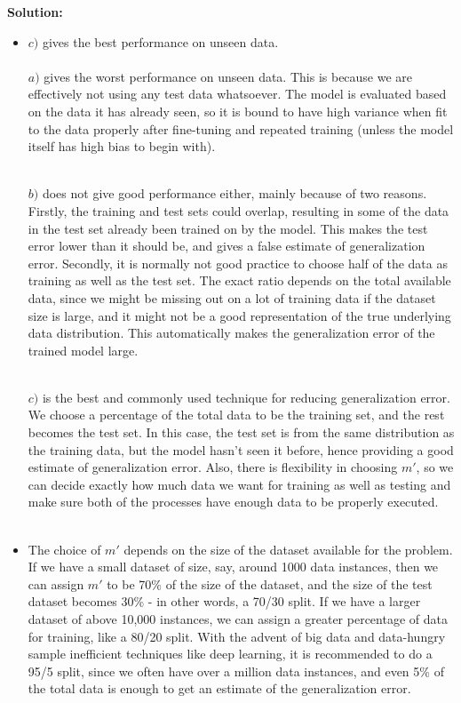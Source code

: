 \documentclass{article}
\begin{document}
\textbf{\LARGE{Solution:}}\Large{\begin{itemize}
    \item $c)$ gives the best performance on unseen data.
    \\\\
    $a)$ gives the worst performance on unseen data. This is because we are effectively not using any test data whatsoever. The model is evaluated based on the data it has already seen, so it is bound to have high variance when fit to the data properly after fine-tuning and repeated training (unless the model itself has high bias to begin with).
        \\\

    $b)$ does not give good performance either, mainly because of two reasons. Firstly, the training and test sets could overlap, resulting in some of the data in the test set already been trained on by the model. This makes the test error lower than it should be, and gives a false estimate of generalization error. Secondly, it is normally not good practice to choose half of the data as training as well as the test set. The exact ratio depends on the total available data, since we might be missing out on a lot of training data if the dataset size is large, and it might not be a good representation of the true underlying data distribution. This automatically makes the generalization error of the trained model large.
        \\\

    $c)$ is the best and commonly used technique for reducing generalization error. We choose a percentage of the total data to be the training set, and the rest becomes the test set. In this case, the test set is from the same distribution as the training data, but the model hasn't seen it before, hence providing a good estimate of generalization error. Also, there is flexibility in choosing $m'$, so we can decide exactly how much data we want for training as well as testing and make sure both of the processes have enough data to be properly executed.
        \\\

    \item The choice of $m'$ depends on the size of the dataset available for the problem. If we have a small dataset of size, say, around 1000 data instances, then we can assign $m'$ to be 70\% of the size of the dataset, and the size of the test dataset becomes 30\% - in other words, a 70/30 split. If we have a larger dataset of above 10,000 instances, we can assign a greater percentage of data for training, like a 80/20 split. With the advent of big data and data-hungry sample inefficient techniques like deep learning, it is recommended to do a 95/5 split, since we often have over a million data instances, and even 5\% of the total data is enough to get an estimate of the generalization error.
\end{itemize}

 }\\\
\smallskip
\hline
\hline
\end{document}
